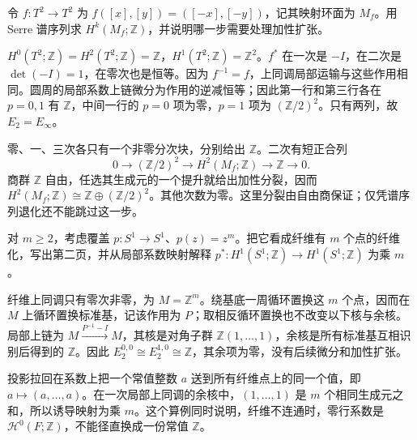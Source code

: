 \begin{exercise}\label{g2:ex:serre-torus-monodromy}
	令 \(f:T^2\to T^2\) 为 \(f([x],[y])=([-x],[-y])\)，记其映射环面为 \(M_f\)。用 Serre 谱序列求 \(H^k(M_f;\mathbb Z)\)，并说明哪一步需要处理加性扩张。
\end{exercise}
\begin{solution}
	\(H^0(T^2;\mathbb Z)=H^2(T^2;\mathbb Z)=\mathbb Z\)，\(H^1(T^2;\mathbb Z)=\mathbb Z^2\)。\(f^*\) 在一次是 \(-I\)，在二次是 \(\det(-I)=1\)，在零次也是恒等。因为 \(f^{-1}=f\)，上同调局部运输与这些作用相同。圆周的局部系数上链微分为作用的逆减恒等；因此第一行和第三行各在 \(p=0,1\) 有 \(\mathbb Z\)，中间一行的 \(p=0\) 项为零，\(p=1\) 项为 \((\mathbb Z/2)^2\)。只有两列，故 \(E_2=E_\infty\)。

	零、一、三次各只有一个非零分次块，分别给出 \(\mathbb Z\)。二次有短正合列
	\[
		0\longrightarrow(\mathbb Z/2)^2\longrightarrow H^2(M_f;\mathbb Z)\longrightarrow\mathbb Z\longrightarrow0.
	\]
	商群 \(\mathbb Z\) 自由，任选其生成元的一个提升就给出加性分裂，因而 \(H^2(M_f;\mathbb Z)\cong\mathbb Z\oplus(\mathbb Z/2)^2\)。其他次数为零。这里分裂由自由商保证；仅凭谱序列退化还不能跳过这一步。
\end{solution}

\begin{exercise}\label{g2:ex:serre-covering-coefficients}
	对 \(m\ge2\)，考虑覆盖 \(p:S^1\to S^1\)、\(p(z)=z^m\)。把它看成纤维有 \(m\) 个点的纤维化，写出第二页，并从局部系数映射解释 \(p^*:H^1(S^1;\mathbb Z)\to H^1(S^1;\mathbb Z)\) 为乘 \(m\)。
\end{exercise}
\begin{solution}
	纤维上同调只有零次非零，为 \(M=\mathbb Z^m\)。绕基底一周循环置换这 \(m\) 个点，因而在 \(M\) 上循环置换标准基，记该作用为 \(P\)；取相反循环置换也不改变以下核与余核。局部上链为 \(M\xrightarrow{P^{-1}-I}M\)，其核是对角子群 \(\mathbb Z(1,\ldots,1)\)，余核是所有标准基互相识别后得到的 \(\mathbb Z\)。因此 \(E_2^{0,0}\cong E_2^{1,0}\cong\mathbb Z\)，其余项为零，没有后续微分和加性扩张。

	投影拉回在系数上把一个常值整数 \(a\) 送到所有纤维点上的同一个值，即 \(a\mapsto(a,\ldots,a)\)。在一次局部上同调的余核中，\((1,\ldots,1)\) 是 \(m\) 个相同生成元之和，所以诱导映射为乘 \(m\)。这个算例同时说明，纤维不连通时，零行系数是 \(\mathcal H^0(F;\mathbb Z)\)，不能径直换成一份常值 \(\mathbb Z\)。
\end{solution}


